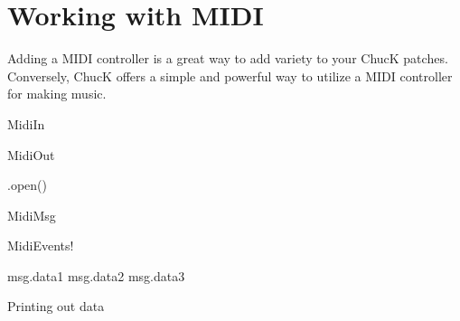 \section{Working with MIDI}

Adding a MIDI controller is a great way to add variety to your ChucK patches. Conversely, ChucK offers a simple and powerful way to utilize a MIDI controller for making music.  


MidiIn

MidiOut

.open()

MidiMsg

MidiEvents!

msg.data1 msg.data2 msg.data3

Printing out data
